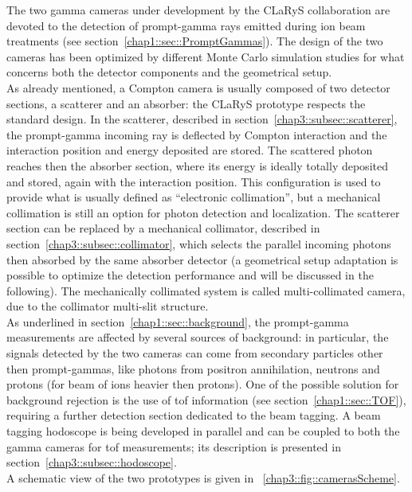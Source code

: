 The two gamma cameras under development by the CLaRyS collaboration are devoted to the detection of prompt-gamma rays emitted during ion beam treatments (see section~\ref{chap1::sec::PromptGammas}). The design of the two cameras has been optimized by different Monte Carlo simulation studies for what concerns both the detector components and the geometrical setup.\\
As already mentioned, a Compton camera is usually composed of two detector sections, a scatterer and an absorber: the CLaRyS prototype respects the standard design. In the scatterer, described in section~\ref{chap3::subsec::scatterer}, the prompt-gamma incoming ray is deflected by Compton interaction and the interaction position and energy deposited are stored. The scattered photon reaches then the absorber section, where its energy is ideally totally deposited and stored, again with the interaction position. This configuration is used to provide what is usually defined as \enquote{electronic collimation}, but a mechanical collimation is still an option for photon detection and localization. The scatterer section can be replaced by a mechanical collimator, described in section~\ref{chap3::subsec::collimator}, which selects the parallel incoming photons then absorbed by the same absorber detector (a geometrical setup adaptation is possible to optimize the detection performance and will be discussed in the following). The mechanically collimated system is called multi-collimated camera, due to the collimator multi-slit structure.\\ 
As underlined in section~\ref{chap1::sec::background}, the prompt-gamma measurements are affected by several sources of background: in particular, the signals detected by the two cameras can come from secondary particles other then prompt-gammas, like photons from positron annihilation, neutrons and protons (for beam of ions heavier then protons). One of the possible solution for background rejection is the use of \gls{tof} information (see section~\ref{chap1::sec::TOF}), requiring a further detection section dedicated to the beam tagging. A beam tagging hodoscope is being developed in parallel and can be coupled to both the gamma cameras for \gls{tof} measurements; its description is presented in section~\ref{chap3::subsec::hodoscope}.\\
A schematic view of the two prototypes is given in \figurename~\ref{chap3::fig::camerasScheme}.\\

